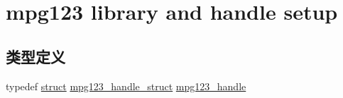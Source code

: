 \hypertarget{group__mpg123__init}{}\section{mpg123 library and handle setup}
\label{group__mpg123__init}
\subsection*{类型定义}
\begin{DoxyCompactItemize}
\item 
typedef \hyperlink{interfacestruct}{struct} \hyperlink{structmpg123__handle__struct}{mpg123\+\_\+handle\+\_\+struct} \hyperlink{group__mpg123__init_ga6728e2839a395f3a07d4514da659faca}{mpg123\+\_\+handle}
\end{DoxyCompactItemize}
